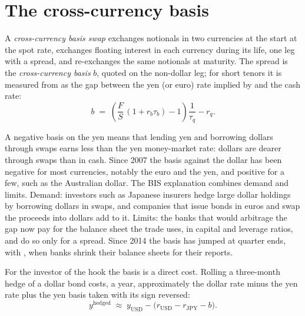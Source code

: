 \section{The cross-currency basis}

\begin{definition}\label{def:m2:fx-swaps-forwards-and-the-cross-currency-basis:basis}
A \emph{cross-currency basis swap} exchanges
notionals in two currencies at the start at the spot rate, exchanges floating
interest in each currency during its life, one leg with a spread, and
re-exchanges the same notionals at maturity. The spread is the
\emph{cross-currency basis} $b$, quoted on the
non-dollar leg; for short tenors it is measured from  as the gap between
the yen (or euro) rate implied by  and the cash rate:
\[
b \;=\; \left(\frac{F}{S}\,(1 + r_b\tau_b) - 1\right)\frac{1}{\tau_q} - r_q.
\]
\end{definition}

A negative basis on the yen means that lending yen and borrowing dollars through
swaps earns less than the yen money-market rate: dollars are dearer through
swaps than in cash. Since 2007 the basis against the dollar has been negative for
most currencies, notably the euro and the yen, and positive for a few, such as
the Australian dollar. The BIS explanation combines demand and limits. Demand:
investors such as Japanese insurers hedge large dollar holdings by borrowing
dollars in swaps, and companies that issue bonds in euros and swap the proceeds
into dollars add to it. Limits: the banks that would arbitrage the gap now pay
for the balance sheet the trade uses, in capital and leverage ratios, and do so
only for a spread. Since 2014 the basis has jumped at quarter ends, with , when banks shrink their balance sheets for their reports.

For the investor of the hook the basis is a direct cost. Rolling a three-month
hedge of a dollar bond costs, a year, approximately the dollar rate minus the
yen rate plus the yen basis taken with its sign reversed:
\begin{equation}\label{eq:m2:fx-swaps-forwards-and-the-cross-currency-basis:hedged}
y^{\mathrm{hedged}} \;\approx\; y_{\mathrm{USD}} - \bigl(r_{\mathrm{USD}} - r_{\mathrm{JPY}} - b\bigr).
\end{equation}

